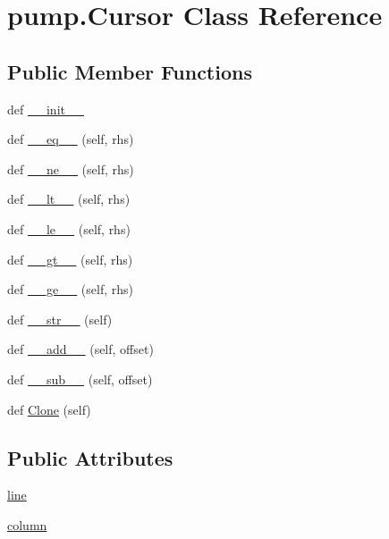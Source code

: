 \hypertarget{classpump_1_1_cursor}{}\section{pump.\+Cursor Class Reference}
\label{classpump_1_1_cursor}
\subsection*{Public Member Functions}
\begin{DoxyCompactItemize}
\item 
def \hyperlink{classpump_1_1_cursor_a8b444121a5ae7d520551323c61138f0f}{\+\_\+\+\_\+init\+\_\+\+\_\+}
\item 
def \hyperlink{classpump_1_1_cursor_ab430cfd4cfd2fa2b57ea31b128e56f22}{\+\_\+\+\_\+eq\+\_\+\+\_\+} (self, rhs)
\item 
def \hyperlink{classpump_1_1_cursor_a7bcfe24fa4e5df6ed12f627b8d3b3ba3}{\+\_\+\+\_\+ne\+\_\+\+\_\+} (self, rhs)
\item 
def \hyperlink{classpump_1_1_cursor_a4f846e3cf80aa45853b1fb7a03863745}{\+\_\+\+\_\+lt\+\_\+\+\_\+} (self, rhs)
\item 
def \hyperlink{classpump_1_1_cursor_a7652488b46ecf1dfa4d0a83bff9411ab}{\+\_\+\+\_\+le\+\_\+\+\_\+} (self, rhs)
\item 
def \hyperlink{classpump_1_1_cursor_aa6109b9e7048e6260c2018a6d8878739}{\+\_\+\+\_\+gt\+\_\+\+\_\+} (self, rhs)
\item 
def \hyperlink{classpump_1_1_cursor_aeadc1924f4435a1a67fada88b0bce40a}{\+\_\+\+\_\+ge\+\_\+\+\_\+} (self, rhs)
\item 
def \hyperlink{classpump_1_1_cursor_ada8d922763be27a0b1745e94748de2c3}{\+\_\+\+\_\+str\+\_\+\+\_\+} (self)
\item 
def \hyperlink{classpump_1_1_cursor_a75b9a3cf0d49413437c8d4fc0d1d5ff3}{\+\_\+\+\_\+add\+\_\+\+\_\+} (self, offset)
\item 
def \hyperlink{classpump_1_1_cursor_a297cc8271af2aade66acb5fa5973a748}{\+\_\+\+\_\+sub\+\_\+\+\_\+} (self, offset)
\item 
def \hyperlink{classpump_1_1_cursor_af68c9be83b0af87db441b21bc6ce8114}{Clone} (self)
\end{DoxyCompactItemize}
\subsection*{Public Attributes}
\begin{DoxyCompactItemize}
\item 
\hyperlink{classpump_1_1_cursor_aee8d8b67360da7fc4e635540cb41d48c}{line}
\item 
\hyperlink{classpump_1_1_cursor_ae73db76c3a845a82afb334633864254e}{column}
\end{DoxyCompactItemize}


